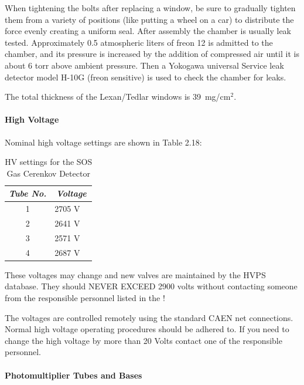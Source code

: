 	When tightening the bolts after replacing a window, be sure to
gradually tighten them from a variety of positions (like putting a wheel
on a car) to distribute the force evenly creating a uniform seal.  After
assembly the chamber is usually leak tested.  Approximately 0.5
atmospheric liters of freon 12 is admitted to the chamber, and its
pressure is increased by the addition of compressed air until it is
about 6 torr above ambient pressure.  Then a Yokogawa universal Service
leak detector model H-10G (freon sensitive) is used to check the chamber
for leaks.

	The total thickness of the Lexan/Tedlar windows is 39~mg/cm$^{2}$.

\paragraph{High Voltage}

	Nominal high voltage settings are shown in Table 2.18:

\begin{table}
\caption{HV settings for the SOS Gas Cerenkov Detector\label{tab:sos_c_hv}}
\begin{center}
\begin{tabular}{|c|c|r} \hline
{\em Tube No.} &
  \multicolumn{2}{c|}{\em Voltage} \\ \hline
 1  & 2705 V  \\
 2  & 2641 V \\
 3  & 2571 V \\
 4  & 2687 V \\ \hline
\end{tabular}
\end{center}
\end{table}
These voltages may change and new valves are maintained by the HVPS
database.  They should NEVER EXCEED 2900 volts
without contacting someone from the responsible personnel listed
in the !

	The voltages are controlled remotely using the standard CAEN net
connections.  Normal high voltage operating procedures should be
adhered to.  If you need to change the high voltage by more than 20
Volts contact one of the responsible personnel.

\paragraph{Photomultiplier Tubes and Bases}

